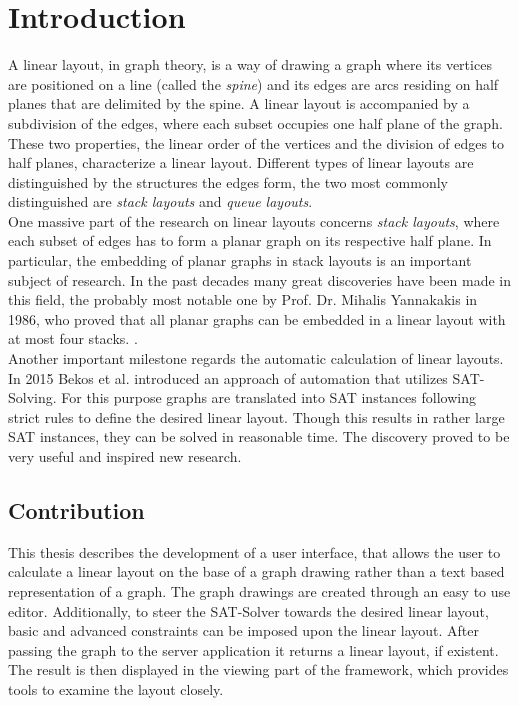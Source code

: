 
\chapter{Introduction}
\label{Introduction}
A linear layout, in graph theory, is a way of drawing a graph where its vertices are positioned on a line (called the \textit{spine}) and its edges are arcs residing on half planes that are delimited by the spine. A linear layout is accompanied by a subdivision of the edges, where each subset occupies one half plane of the graph.\\
These two properties, the linear order of the vertices and the division of edges to half planes, characterize a linear layout. Different types of linear layouts are distinguished by the structures the edges form, the two most commonly distinguished are \textit{stack layouts} and \textit{queue layouts}.\\
One massive part of the research on linear layouts concerns \textit{stack layouts}, where each subset of edges has to form a planar graph on its respective half plane. In particular, the embedding of planar graphs in stack layouts is an important subject of research. In the past decades many great discoveries have been made in this field, the probably most notable one by Prof. Dr. Mihalis Yannakakis in 1986, who proved that all planar graphs can be embedded in a linear layout with at most four stacks.  \cite{yannakakis1986four,yannakakis1989embedding}.\\
Another important milestone regards the automatic calculation of linear layouts. In 2015 Bekos et al.\cite{Bekos2015TheBE} introduced an approach of automation that utilizes SAT-Solving. For this purpose graphs are translated into SAT instances following strict rules to define the desired linear layout. Though this results in rather large SAT instances, they can be solved in reasonable time. The discovery proved to be very useful and inspired new research.
\section{Contribution}
This thesis describes the development of a user interface, that allows the user to calculate a linear layout on the base of a graph drawing rather than a text based representation of a graph. The graph drawings are created through an easy to use editor. Additionally, to steer the SAT-Solver towards the desired linear layout, basic and advanced constraints can be imposed upon the linear layout. After passing the graph to the server application it returns a linear layout, if existent. The result is then displayed in the viewing part of the framework, which provides tools to examine the layout closely. 
